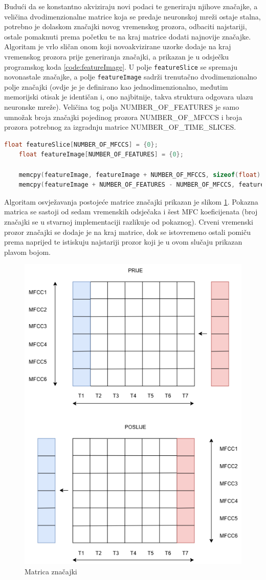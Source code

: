 Budući da se konstantno akviziraju novi podaci te generiraju njihove značajke, a veličina
dvodimenzionalne matrice koja se predaje neuronskoj mreži ostaje stalna, potrebno je 
dolaskom značajki novog vremenskog prozora, odbaciti najstariji, ostale pomaknuti prema početku
te na kraj matrice dodati najnovije značajke. Algoritam je vrlo sličan onom koji novoakvizirane
uzorke dodaje na kraj vremenskog prozora prije generiranja značajki, a prikazan je u odsječku
programskog koda \ref{code:featureImage}. U polje \texttt{featureSlice} se spremaju novonastale
značajke, a polje \texttt{featureImage} sadrži trenutačno dvodimenzionalno polje značajki (ovdje je
je definirano kao jednodimenzionalno, međutim memorijski otisak je identičan i, ono najbitnije,
takva struktura odgovara ulazu neuronske mreže). Veličina tog polja NUMBER\_OF\_FEATURES je samo
umnožak broja značajki pojedinog prozora NUMBER\_OF\_MFCCS i broja prozora potrebnog za 
izgradnju matrice NUMBER\_OF\_TIME\_SLICES.

\begin{lstlisting}[language=C++, caption=Generiranje matrice značajki, label=code:featureImage]
    float featureSlice[NUMBER_OF_MFCCS] = {0};
    float featureImage[NUMBER_OF_FEATURES] = {0};

    memcpy(featureImage, featureImage + NUMBER_OF_MFCCS, sizeof(float) * (NUMBER_OF_FEATURES - NUMBER_OF_MFCCS));
    memcpy(featureImage + NUMBER_OF_FEATURES - NUMBER_OF_MFCCS, featureSlice, sizeof(float) * NUMBER_OF_MFCCS);
\end{lstlisting}

Algoritam osvježavanja postojeće matrice značajki prikazan je slikom \ref{pic:featureImage}. 
Pokazna matrica se sastoji od sedam vremenskih odsječaka i šest MFC koeficijenata
(broj značajki se u stvarnoj implementaciji razlikuje od pokaznog). Crveni 
vremenski prozor značajki se dodaje je na kraj matrice, dok se istovremeno ostali pomiču prema
naprijed te istiskuju najstariji prozor koji je u ovom slučaju prikazan plavom bojom.

\begin{figure}[htb]
    \centering
    \includegraphics[width=0.4\linewidth]{Chapters/struktura_sustava/generiranje_znacajki/featureImage.png} 
    \caption{Matrica značajki \cite{flowchart}}
    \label{pic:featureImage}
\end{figure}